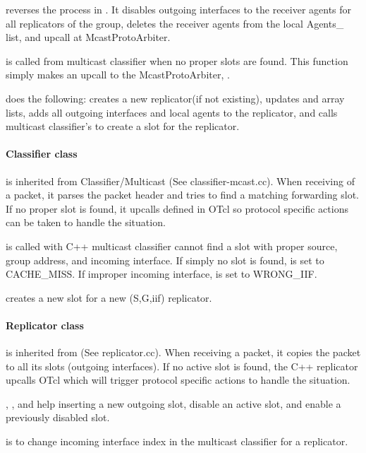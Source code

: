  reverses the process in .  It disables outgoing interfaces to the receiver agents for all replicators of the group, deletes the receiver agents from the local Agents_ list, and upcall  at McastProtoArbiter.

 is called from multicast classifier when no proper slots are found.  This function simply makes an upcall to the McastProtoArbiter, .

 does the following: creates a new replicator(if not existing), updates  and  array lists, adds all outgoing interfaces and local agents to the replicator, and calls multicast classifier's  to create a slot for the replicator.

\paragraph{Classifier class}
 is inherited from Classifier/Multicast (See classifier-mcast.cc).  When receiving of a packet, it parses the packet header and tries to find a matching forwarding slot. If no proper slot is found, it upcalls  defined in OTcl so protocol specific actions can be taken to handle the situation.

 is called with C++ multicast classifier cannot find a slot with proper source, group address, and incoming interface.  If simply no slot is found,  is set to CACHE_MISS.  If improper incoming interface,  is set to WRONG_IIF.

 creates a new slot for a new (S,G,iif) replicator.


\paragraph{Replicator class}
 is inherited from  (See replicator.cc).  When receiving a packet, it copies the packet to all its slots (outgoing interfaces). If no active slot is found, the C++ replicator upcalls OTcl  which will trigger protocol specific actions to handle the situation.

, , and  help inserting a new outgoing slot, disable an active slot, and enable a previously disabled slot.

 is to change incoming interface index in the multicast classifier for a replicator.

